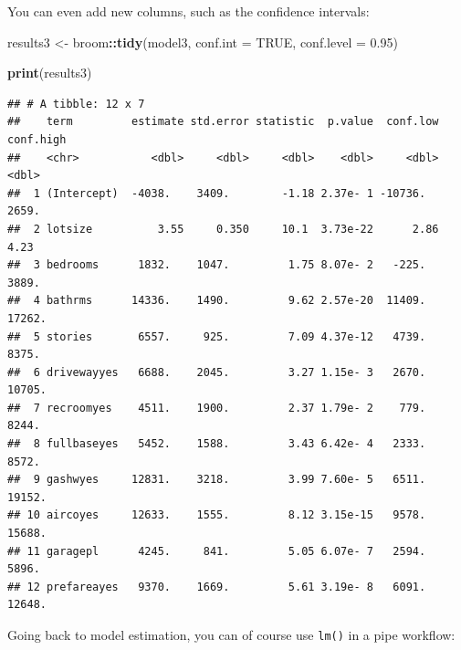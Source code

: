 \documentclass[]{gitbook}
\newenvironment{Shaded}{\begin{snugshade}}{\end{snugshade}}
\newcommand{\DataTypeTok}[1]{\textcolor[rgb]{0.13,0.29,0.53}{#1}}
\newcommand{\FloatTok}[1]{\textcolor[rgb]{0.00,0.00,0.81}{#1}}
\newcommand{\KeywordTok}[1]{\textcolor[rgb]{0.13,0.29,0.53}{\textbf{#1}}}
\newcommand{\NormalTok}[1]{#1}
\newcommand{\OperatorTok}[1]{\textcolor[rgb]{0.81,0.36,0.00}{\textbf{#1}}}
\newcommand{\OtherTok}[1]{\textcolor[rgb]{0.56,0.35,0.01}{#1}}
\newcommand{\StringTok}[1]{\textcolor[rgb]{0.31,0.60,0.02}{#1}}
\begin{document}
You can even add new columns, such as the confidence intervals:

\begin{Shaded}
\begin{Highlighting}[]
\NormalTok{results3 <-}\StringTok{ }\NormalTok{broom}\OperatorTok{::}\KeywordTok{tidy}\NormalTok{(model3, }\DataTypeTok{conf.int =} \OtherTok{TRUE}\NormalTok{, }\DataTypeTok{conf.level =} \FloatTok{0.95}\NormalTok{)}

\KeywordTok{print}\NormalTok{(results3)}
\end{Highlighting}
\end{Shaded}

\begin{verbatim}
## # A tibble: 12 x 7
##    term         estimate std.error statistic  p.value  conf.low conf.high
##    <chr>           <dbl>     <dbl>     <dbl>    <dbl>     <dbl>     <dbl>
##  1 (Intercept)  -4038.    3409.        -1.18 2.37e- 1 -10736.     2659.  
##  2 lotsize          3.55     0.350     10.1  3.73e-22      2.86      4.23
##  3 bedrooms      1832.    1047.         1.75 8.07e- 2   -225.     3889.  
##  4 bathrms      14336.    1490.         9.62 2.57e-20  11409.    17262.  
##  5 stories       6557.     925.         7.09 4.37e-12   4739.     8375.  
##  6 drivewayyes   6688.    2045.         3.27 1.15e- 3   2670.    10705.  
##  7 recroomyes    4511.    1900.         2.37 1.79e- 2    779.     8244.  
##  8 fullbaseyes   5452.    1588.         3.43 6.42e- 4   2333.     8572.  
##  9 gashwyes     12831.    3218.         3.99 7.60e- 5   6511.    19152.  
## 10 aircoyes     12633.    1555.         8.12 3.15e-15   9578.    15688.  
## 11 garagepl      4245.     841.         5.05 6.07e- 7   2594.     5896.  
## 12 prefareayes   9370.    1669.         5.61 3.19e- 8   6091.    12648.
\end{verbatim}

Going back to model estimation, you can of course use \texttt{lm()} in a pipe workflow:

\begin{Shaded}
\end{Shaded}
\end{document}
